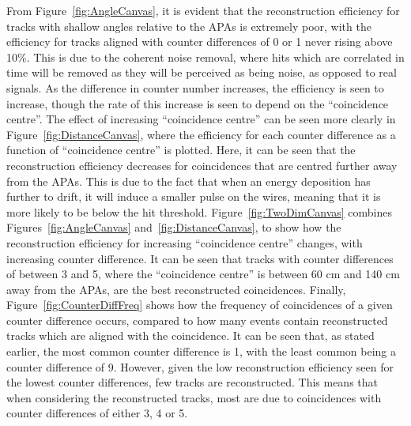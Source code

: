 From Figure~\ref{fig:AngleCanvas}, it is evident that the reconstruction efficiency for tracks with shallow angles relative to the APAs is extremely poor, with the efficiency for tracks aligned with counter differences of 0 or 1 never rising above 10\%. This is due to the coherent noise removal, where hits which are correlated in time will be removed as they will be perceived as being noise, as opposed to real signals. As the difference in counter number increases, the efficiency is seen to increase, though the rate of this increase is seen to depend on the ``coincidence centre''. The effect of increasing ``coincidence centre'' can be seen more clearly in Figure~\ref{fig:DistanceCanvas}, where the efficiency for each counter difference as a function of ``coincidence centre'' is plotted. Here, it can be seen that the reconstruction efficiency decreases for coincidences that are centred further away from the APAs. This is due to the fact that when an energy deposition has further to drift, it will induce a smaller pulse on the wires, meaning that it is more likely to be below the hit threshold. Figure~\ref{fig:TwoDimCanvas} combines Figures~\ref{fig:AngleCanvas} and~\ref{fig:DistanceCanvas}, to show how the reconstruction efficiency for increasing ``coincidence centre'' changes, with increasing counter difference. It can be seen that tracks with counter differences of between 3 and 5, where the ``coincidence centre'' is between 60 cm and 140 cm away from the APAs, are the best reconstructed coincidences. Finally, Figure~\ref{fig:CounterDiffFreq} shows how the frequency of coincidences of a given counter difference occurs, compared to how many events contain reconstructed tracks which are aligned with the coincidence. It can be seen that, as stated earlier, the most common counter difference is 1, with the least common being a counter difference of 9. However, given the low reconstruction efficiency seen for the lowest counter differences, few tracks are reconstructed. This means that when considering the reconstructed tracks, most are due to coincidences with counter differences of either 3, 4 or 5.

